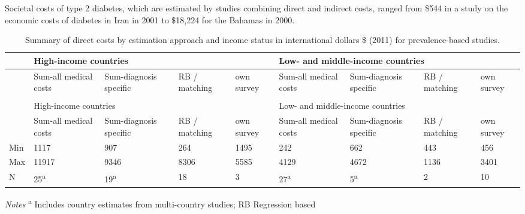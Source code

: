 Societal costs of type 2 diabetes, which are estimated by studies combining direct and indirect costs, ranged from \$544 in a study on the economic costs of diabetes in Iran \parencite{Esteghamati2009} in 2001 to \$18,224 for the Bahamas \parencite{Barcelo2003} in 2000. 

\begin{table}[p]
\begin{center}

\begin{threeparttable}
\begin{tabularx}{\linewidth}{X X X X X X X X X}
\caption{\label{tab:review_direct_costs_summary}Summary of direct costs by estimation approach and income status in international dollars \$ (2011) for prevalence-based studies.}\\
\toprule
& \multicolumn{4}{l}{High-income countries} & \multicolumn{4}{l}{Low- and middle-income countries} \\ \midrule
 & Sum-all medical costs & Sum-diagnosis specific & RB / matching & own survey & Sum-all medical costs & Sum-diagnosis specific & RB / matching & own survey \\ \midrule \endfirsthead
\caption[]{Summary of direct costs by estimation approach and income status in international dollars \$ (2011) for prevalence-based studies.}\\
 \toprule
 & \multicolumn{4}{l}{High-income countries} & \multicolumn{4}{l}{Low- and middle-income countries} \\ \midrule
  & Sum-all medical costs & Sum-diagnosis specific & RB / matching & own survey & Sum-all medical costs & Sum-diagnosis specific & RB / matching & own survey \\ \midrule \endhead
Min & 1117 & 907 & 264 & 1495 & 242 & 662 & 443 & 456 \\
Max & 11917 & 9346 & 8306 & 5585 & 4129 & 4672 & 1136 & 3401 \\
N & 25\textsuperscript{a} & 19\textsuperscript{a} & 18 & 3 & 27\textsuperscript{a} & 5\textsuperscript{a} & 2 & 10\\
 \bottomrule
\end{tabularx}
\begin{tablenotes}
\item \footnotesize \textit{Notes} \textsuperscript{a} Includes country estimates from multi-country studies; RB Regression based
\end{tablenotes}
\end{threeparttable}
\end{center}
\end{table}


